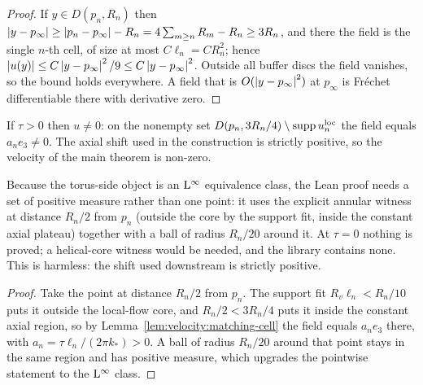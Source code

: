 \begin{proof}
  \leanok
  If $y\in D(p_n,R_n) $ then
  $\left\lvert y-p_\infty\right\rvert\geq\left\lvert p_n-p_\infty\right\rvert-R_n=4\sum_{m\geq n}R_m-R_n\geq3R_n $, and there the
  field is the single $n $-th cell, of size at most $C\ell_n=CR_n^2 $; hence
  $\left\lvert u(y)\right\rvert\leq C\left\lvert y-p_\infty\right\rvert^2/9\leq C\left\lvert y-p_\infty\right\rvert^2 $.  Outside all buffer discs
  the field vanishes, so the bound holds everywhere.  A field that is
  $O(\left\lvert y-p_\infty\right\rvert^2) $ at $p_\infty $ is Fr\'echet differentiable there with derivative
  zero.
\end{proof}

\begin{lemma}
  \label{lem:velocity:nonvanishing}
  \leanok
  If $\tau>0 $ then $u\neq0 $: on the nonempty set
  $D(p_n,3R_n/4)\setminus\operatorname{supp} u_n^\mathrm{loc} $ the field equals $a_ne_3\neq0 $.  The axial
  shift used in the construction is strictly positive, so the velocity of the main
  theorem is non-zero.
\end{lemma}

Because the torus-side object is an $\mathrm{L}^\infty $ equivalence class, the Lean proof needs
a set of positive measure rather than one point: it uses the explicit annular witness at
distance $R_n/2 $ from $p_n $ (outside the core by the support fit, inside the constant
axial plateau) together with a ball of radius $R_n/20 $ around it.  At $\tau=0 $ nothing
is proved; a helical-core witness would be needed, and the library contains none.
This is harmless: the shift used downstream is strictly positive.

\begin{proof}
  \leanok
  Take the point at distance $R_n/2 $ from $p_n $.  The support fit $R_v\ell_n<R_n/10 $ puts
  it outside the local-flow core, and $R_n/2<3R_n/4 $ puts it inside the constant axial
  region, so by Lemma~\ref{lem:velocity:matching-cell} the field equals $a_ne_3 $ there,
  with $a_n=\tau\ell_n/(2\pi k_*)>0 $.  A ball of radius $R_n/20 $ around that point stays
  in the same region and has positive measure, which upgrades the pointwise statement to the
  $\mathrm{L}^\infty $ class.
\end{proof}


